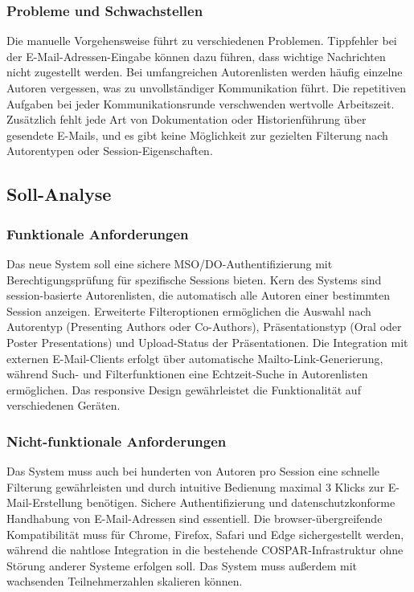 \documentclass[11pt,a4paper]{article}
\begin{document}
\subsubsection{Probleme und Schwachstellen}
Die manuelle Vorgehensweise führt zu verschiedenen Problemen. Tippfehler bei der E-Mail-Adressen-Eingabe können dazu führen, dass wichtige Nachrichten nicht zugestellt werden. Bei umfangreichen Autorenlisten werden häufig einzelne Autoren vergessen, was zu unvollständiger Kommunikation führt. Die repetitiven Aufgaben bei jeder Kommunikationsrunde verschwenden wertvolle Arbeitszeit. Zusätzlich fehlt jede Art von Dokumentation oder Historienführung über gesendete E-Mails, und es gibt keine Möglichkeit zur gezielten Filterung nach Autorentypen oder Session-Eigenschaften.

\subsection{Soll-Analyse}

\subsubsection{Funktionale Anforderungen}
Das neue System soll eine sichere MSO/DO-Authentifizierung mit Berechtigungsprüfung für spezifische Sessions bieten. Kern des Systems sind session-basierte Autorenlisten, die automatisch alle Autoren einer bestimmten Session anzeigen. Erweiterte Filteroptionen ermöglichen die Auswahl nach Autorentyp (Presenting Authors oder Co-Authors), Präsentationstyp (Oral oder Poster Presentations) und Upload-Status der Präsentationen. Die Integration mit externen E-Mail-Clients erfolgt über automatische Mailto-Link-Generierung, während Such- und Filterfunktionen eine Echtzeit-Suche in Autorenlisten ermöglichen. Das responsive Design gewährleistet die Funktionalität auf verschiedenen Geräten.

\subsubsection{Nicht-funktionale Anforderungen}
Das System muss auch bei hunderten von Autoren pro Session eine schnelle Filterung gewährleisten und durch intuitive Bedienung maximal 3 Klicks zur E-Mail-Erstellung benötigen. Sichere Authentifizierung und datenschutzkonforme Handhabung von E-Mail-Adressen sind essentiell. Die browser-übergreifende Kompatibilität muss für Chrome, Firefox, Safari und Edge sichergestellt werden, während die nahtlose Integration in die bestehende COSPAR-Infrastruktur ohne Störung anderer Systeme erfolgen soll. Das System muss außerdem mit wachsenden Teilnehmerzahlen skalieren können.
\end{document}
